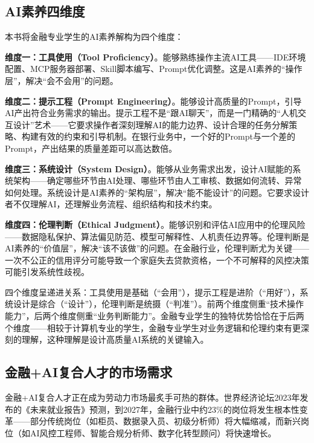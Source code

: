 \subsection{AI素养四维度}

本书将金融专业学生的AI素养解构为四个维度：

\textbf{维度一：工具使用（Tool Proficiency）}。能够熟练操作主流AI工具——IDE环境配置、MCP服务器部署、Skill脚本编写、Prompt优化调整。这是AI素养的``操作层''，解决``会不会用''的问题。

\textbf{维度二：提示工程（Prompt Engineering）}。能够设计高质量的Prompt，引导AI产出符合业务需求的输出。提示工程不是``跟AI聊天''，而是一门精确的``人机交互设计''艺术——它要求操作者深刻理解AI的能力边界、设计合理的任务分解策略、构建有效的约束和引导机制。在银行业务中，一个好的Prompt与一个差的Prompt，产出结果的质量差距可以高达数倍。

\textbf{维度三：系统设计（System Design）}。能够从业务需求出发，设计AI赋能的系统架构——确定哪些环节由AI处理、哪些环节由人工审核、数据如何流转、异常如何处理。系统设计是AI素养的``架构层''，解决``能不能设计''的问题。它要求设计者不仅理解AI，还理解业务流程、组织结构和技术约束。

\textbf{维度四：伦理判断（Ethical Judgment）}。能够识别和评估AI应用中的伦理风险——数据隐私保护、算法偏见防范、模型可解释性、人机责任边界等。伦理判断是AI素养的``价值层''，解决``该不该做''的问题。在金融行业，伦理判断尤为关键——一次不公正的信用评分可能导致一个家庭失去贷款资格，一个不可解释的风控决策可能引发系统性歧视。

\begin{theorybox}[AI素养四维度的递进关系]
四个维度呈递进关系：工具使用是基础（``会用''），提示工程是进阶（``用好''），系统设计是综合（``设计''），伦理判断是统摄（``判准''）。前两个维度侧重``技术操作能力''，后两个维度侧重``业务判断能力''。金融专业学生的独特优势恰恰在于后两个维度——相较于计算机专业的学生，金融专业学生对业务逻辑和伦理约束有更深刻的理解，这种理解是设计高质量AI系统的关键输入。
\end{theorybox}

\subsection{金融+AI复合人才的市场需求}

金融+AI复合人才正在成为劳动力市场最炙手可热的群体。世界经济论坛2023年发布的《未来就业报告》预测，到2027年，金融行业中约23\%的岗位将发生根本性变革——部分传统岗位（如柜员、数据录入员、初级分析师）将大幅缩减，而新兴岗位（如AI风控工程师、智能合规分析师、数字化转型顾问）将快速增长\parencite{wef2023jobs}。

